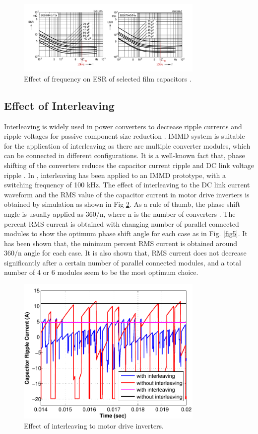 \documentclass[conference,a4paper,twocolumn]{IEEEtran}
\begin{document}
\begin{figure}[h]
  \centering
  \includegraphics[width=9cm]{esr}
  \caption{Effect of frequency on ESR of selected film capacitors \cite{Polypropylene2009}.}
  \label{esr}
\end{figure}


\subsection{Effect of Interleaving}

Interleaving is widely used in power converters to decrease ripple currents and ripple voltages for passive component size reduction \cite{Zhang2010}. IMMD system is suitable for the application of interleaving as there are multiple converter modules, which can be connected in different configurations. It is a well-known fact that, phase shifting of the converters reduces the capacitor current ripple and DC link voltage ripple \cite{LoCalzo2016,Wang2015b,Su2010}. In \cite{Wang2015b}, interleaving has been applied to an IMMD prototype, with a switching frequency of 100 kHz. The effect of interleaving to the DC link current waveform and the RMS value of the capacitor current in motor drive inverters is obtained by simulation as shown in Fig \ref{fig4}. As a rule of thumb, the phase shift angle is usually applied as 360/n, where n is the number of converters \cite{LoCalzo2016}. The percent RMS current is obtained with changing number of parallel connected modules to show the optimum phase shift angle for each case as in Fig. \ref{fig5}. It has been shown that, the minimum percent RMS current is obtained around 360/n angle for each case. It is also shown that, RMS current does not decrease significantly after a certain number of parallel connected modules, and a total number of 4 or 6 modules seem to be the most optimum choice.


\begin{figure}[h]
  \centering
  \includegraphics[width=9cm]{fig4_2}
  \caption{Effect of interleaving to motor drive inverters.}
  \label{fig4}
\end{figure}
\end{document}
